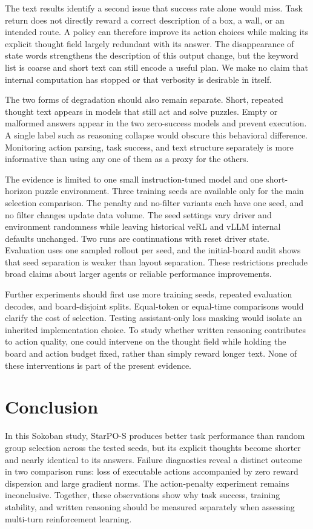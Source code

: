 \documentclass[10pt,twocolumn,letterpaper]{article}
\begin{document}
The text results identify a second issue that success rate alone would miss. Task return does not directly reward a correct description of a box, a wall, or an intended route. A policy can therefore improve its action choices while making its explicit thought field largely redundant with its answer. The disappearance of state words strengthens the description of this output change, but the keyword list is coarse and short text can still encode a useful plan. We make no claim that internal computation has stopped or that verbosity is desirable in itself.

The two forms of degradation should also remain separate. Short, repeated thought text appears in models that still act and solve puzzles. Empty or malformed answers appear in the two zero-success models and prevent execution. A single label such as reasoning collapse would obscure this behavioral difference. Monitoring action parsing, task success, and text structure separately is more informative than using any one of them as a proxy for the others.

The evidence is limited to one small instruction-tuned model and one short-horizon puzzle environment. Three training seeds are available only for the main selection comparison. The penalty and no-filter variants each have one seed, and no filter changes update data volume. The seed settings vary driver and environment randomness while leaving historical veRL and vLLM internal defaults unchanged. Two runs are continuations with reset driver state. Evaluation uses one sampled rollout per seed, and the initial-board audit shows that seed separation is weaker than layout separation. These restrictions preclude broad claims about larger agents or reliable performance improvements.

Further experiments should first use more training seeds, repeated evaluation decodes, and board-disjoint splits. Equal-token or equal-time comparisons would clarify the cost of selection. Testing assistant-only loss masking would isolate an inherited implementation choice. To study whether written reasoning contributes to action quality, one could intervene on the thought field while holding the board and action budget fixed, rather than simply reward longer text. None of these interventions is part of the present evidence.

\section{Conclusion}\label{sec:conclusion}
In this Sokoban study, StarPO-S produces better task performance than random group selection across the tested seeds, but its explicit thoughts become shorter and nearly identical to its answers. Failure diagnostics reveal a distinct outcome in two comparison runs: loss of executable actions accompanied by zero reward dispersion and large gradient norms. The action-penalty experiment remains inconclusive. Together, these observations show why task success, training stability, and written reasoning should be measured separately when assessing multi-turn reinforcement learning.
\end{document}
